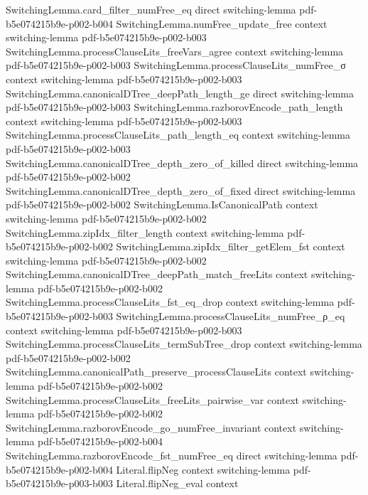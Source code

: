 \begin{lemma}
\proofstep
  {SwitchingLemma.card_filter_numFree_eq}
  {direct}
  {switching-lemma}
  {pdf-b5e074215b9e-p002-b004}
\proofstep
  {SwitchingLemma.numFree_update_free}
  {context}
  {switching-lemma}
  {pdf-b5e074215b9e-p002-b003}
\proofstep
  {SwitchingLemma.processClauseLits_freeVars_agree}
  {context}
  {switching-lemma}
  {pdf-b5e074215b9e-p002-b003}
\proofstep
  {SwitchingLemma.processClauseLits_numFree_σ}
  {context}
  {switching-lemma}
  {pdf-b5e074215b9e-p002-b003}
\proofstep
  {SwitchingLemma.canonicalDTree_deepPath_length_ge}
  {direct}
  {switching-lemma}
  {pdf-b5e074215b9e-p002-b003}
\proofstep
  {SwitchingLemma.razborovEncode_path_length}
  {context}
  {switching-lemma}
  {pdf-b5e074215b9e-p002-b003}
\proofstep
  {SwitchingLemma.processClauseLits_path_length_eq}
  {context}
  {switching-lemma}
  {pdf-b5e074215b9e-p002-b003}
\proofstep
  {SwitchingLemma.canonicalDTree_depth_zero_of_killed}
  {direct}
  {switching-lemma}
  {pdf-b5e074215b9e-p002-b002}
\proofstep
  {SwitchingLemma.canonicalDTree_depth_zero_of_fixed}
  {direct}
  {switching-lemma}
  {pdf-b5e074215b9e-p002-b002}
\proofstep
  {SwitchingLemma.IsCanonicalPath}
  {context}
  {switching-lemma}
  {pdf-b5e074215b9e-p002-b002}
\proofstep
  {SwitchingLemma.zipIdx_filter_length}
  {context}
  {switching-lemma}
  {pdf-b5e074215b9e-p002-b002}
\proofstep
  {SwitchingLemma.zipIdx_filter_getElem_fst}
  {context}
  {switching-lemma}
  {pdf-b5e074215b9e-p002-b002}
\proofstep
  {SwitchingLemma.canonicalDTree_deepPath_match_freeLits}
  {context}
  {switching-lemma}
  {pdf-b5e074215b9e-p002-b002}
\proofstep
  {SwitchingLemma.processClauseLits_fst_eq_drop}
  {context}
  {switching-lemma}
  {pdf-b5e074215b9e-p002-b003}
\proofstep
  {SwitchingLemma.processClauseLits_numFree_ρ_eq}
  {context}
  {switching-lemma}
  {pdf-b5e074215b9e-p002-b003}
\proofstep
  {SwitchingLemma.processClauseLits_termSubTree_drop}
  {context}
  {switching-lemma}
  {pdf-b5e074215b9e-p002-b002}
\proofstep
  {SwitchingLemma.canonicalPath_preserve_processClauseLits}
  {context}
  {switching-lemma}
  {pdf-b5e074215b9e-p002-b002}
\proofstep
  {SwitchingLemma.processClauseLits_freeLits_pairwise_var}
  {context}
  {switching-lemma}
  {pdf-b5e074215b9e-p002-b002}
\proofstep
  {SwitchingLemma.razborovEncode_go_numFree_invariant}
  {context}
  {switching-lemma}
  {pdf-b5e074215b9e-p002-b004}
\proofstep
  {SwitchingLemma.razborovEncode_fst_numFree_eq}
  {direct}
  {switching-lemma}
  {pdf-b5e074215b9e-p002-b004}
\proofstep
  {Literal.flipNeg}
  {context}
  {switching-lemma}
  {pdf-b5e074215b9e-p003-b003}
\proofstep
  {Literal.flipNeg_eval}
  {context}

\end{lemma}
